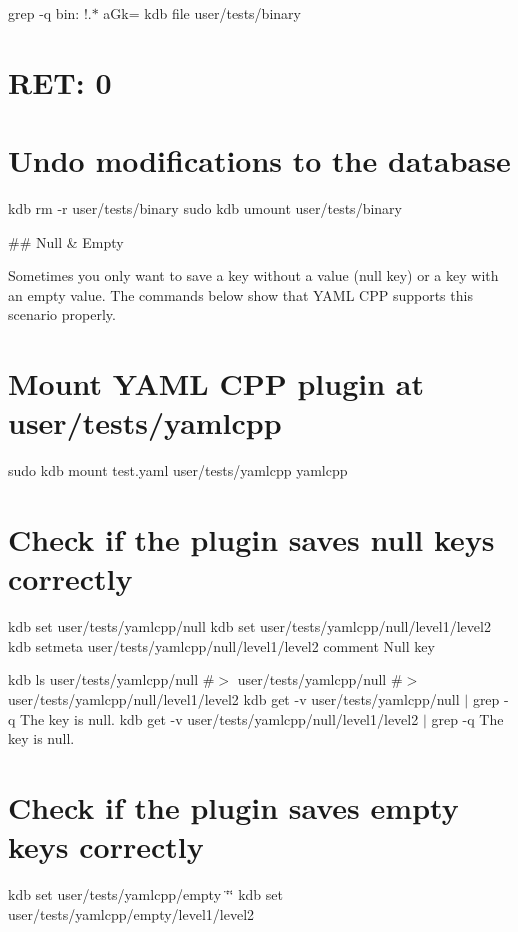 grep -\/q \textquotesingle{}bin\+: !.$\ast$ a\+Gk=\textquotesingle{} {\ttfamily kdb file user/tests/binary} \section*{R\+ET\+: 0}

\section*{Undo modifications to the database}

kdb rm -\/r user/tests/binary sudo kdb umount user/tests/binary 
\begin{DoxyCode}
## Null & Empty

Sometimes you only want to save a key without a value (null key) or a key with an empty value. The commands
       below show that YAML CPP supports this scenario properly.
\end{DoxyCode}
 \section*{Mount Y\+A\+ML C\+PP plugin at {\ttfamily user/tests/yamlcpp}}

sudo kdb mount test.\+yaml user/tests/yamlcpp yamlcpp

\section*{Check if the plugin saves null keys correctly}

kdb set user/tests/yamlcpp/null kdb set user/tests/yamlcpp/null/level1/level2 kdb setmeta user/tests/yamlcpp/null/level1/level2 comment \textquotesingle{}Null key\textquotesingle{}

kdb ls user/tests/yamlcpp/null \#$>$ user/tests/yamlcpp/null \#$>$ user/tests/yamlcpp/null/level1/level2 kdb get -\/v user/tests/yamlcpp/null $\vert$ grep -\/q \textquotesingle{}The key is null.\textquotesingle{} kdb get -\/v user/tests/yamlcpp/null/level1/level2 $\vert$ grep -\/q \textquotesingle{}The key is null.\textquotesingle{}

\section*{Check if the plugin saves empty keys correctly}

kdb set user/tests/yamlcpp/empty \char`\"{}\char`\"{} kdb set user/tests/yamlcpp/empty/level1/level2


